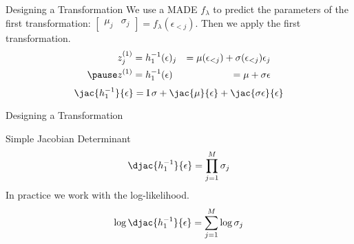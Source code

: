 \documentclass[14pt]{beamer}
\begin{document}
\begin{frame}{Designing a Transformation}
We use a MADE $ f_{\lambda} $ to predict the parameters of the first transformation: $ \begin{bmatrix} \mu_{j} & \sigma_{j} \end{bmatrix} =  f_{\lambda}(\epsilon_{<j}) $.
Then we apply the first transformation.
\begin{equation*}
\begin{aligned}
z^{(1)}_{j} &= h^{-1}_{1}(\epsilon)_{j} &= \mu(\epsilon_{<j}) + \sigma(\epsilon_{<j}) \epsilon_{j} \\ \pause
z^{(1)} &= h^{-1}_{1}(\epsilon) &= \mu + \sigma \epsilon
\end{aligned}
\end{equation*}
\pause
\begin{equation*}
\jac{h^{-1}_{1}}{\epsilon} = \IMatrix \sigma + \jac{\mu}{\epsilon} +\jac{\sigma \epsilon}{\epsilon}
\end{equation*}
\end{frame}

\begin{frame}{Designing a Transformation}
\begin{block}{Simple Jacobian Determinant}
\begin{equation*}
\djac{h^{-1}_{1}}{\epsilon} = \prod_{j=1}^{M}\sigma_{j}
\end{equation*}
In practice we work with the log-likelihood.
\begin{equation*}
\log\djac{h^{-1}_{1}}{\epsilon} = \sum_{j=1}^{M}\log\sigma_{j}
\end{equation*}
\end{block}
\end{frame}
\end{document}
